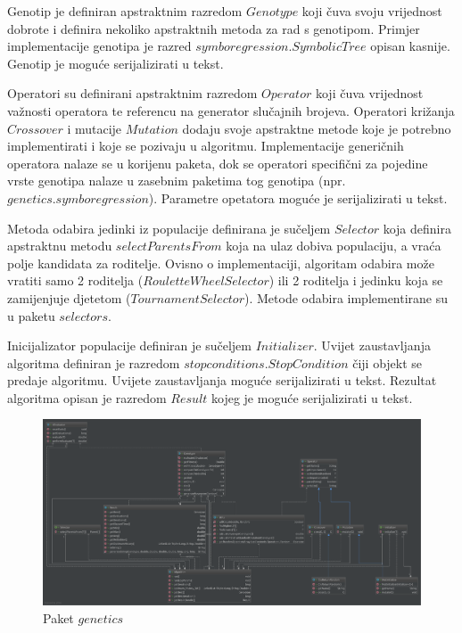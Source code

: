 \documentclass[times, utf8, numeric, diplomski]{fer}
\begin{document}
Genotip je definiran apstraktnim razredom $Genotype$ koji čuva svoju vrijednost dobrote i definira nekoliko apstraktnih metoda za rad s genotipom. Primjer implementacije genotipa je razred $symboregression.SymbolicTree$ opisan kasnije. Genotip je moguće serijalizirati u tekst.

Operatori su definirani apstraktnim razredom $Operator$ koji čuva vrijednost važnosti operatora te referencu na generator slučajnih brojeva. Operatori križanja $Crossover$ i mutacije $Mutation$ dodaju svoje apstraktne metode koje je potrebno implementirati i koje se pozivaju u algoritmu. Implementacije generičnih operatora nalaze se u korijenu paketa, dok se operatori specifični za pojedine vrste genotipa nalaze u zasebnim paketima tog genotipa (npr. $genetics.symboregression$). Parametre opetatora moguće je serijalizirati u tekst.

Metoda odabira jedinki iz populacije definirana je sučeljem $Selector$ koja definira apstraktnu metodu $selectParentsFrom$ koja na ulaz dobiva populaciju, a vraća polje kandidata za roditelje. Ovisno o implementaciji, algoritam odabira može vratiti samo 2 roditelja ($RouletteWheelSelector$) ili 2 roditelja i jedinku koja se zamijenjuje djetetom ($TournamentSelector$). Metode odabira implementirane su u paketu $selectors$.

Inicijalizator populacije definiran je sučeljem $Initializer$. Uvijet zaustavljanja algoritma definiran je razredom $stopconditions.StopCondition$ čiji objekt se predaje algoritmu. Uvijete zaustavljanja moguće serijalizirati u tekst. Rezultat algoritma opisan je razredom $Result$ kojeg je moguće serijalizirati u tekst.

\begin{figure}[ht]
\includegraphics[width=\textwidth]{pkg_genetics.pdf}
\centering
\caption{Paket $genetics$}
\label{fig:pkg_genetics}
\end{figure}
\end{document}
